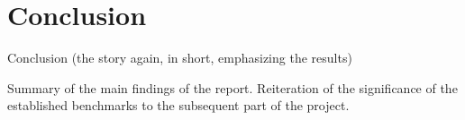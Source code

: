 \section{Conclusion}\label{sec:conclusion}
Conclusion (the story again, in short, emphasizing the results)

Summary of the main findings of the report.
Reiteration of the significance of the established benchmarks to the subsequent part of the project.

